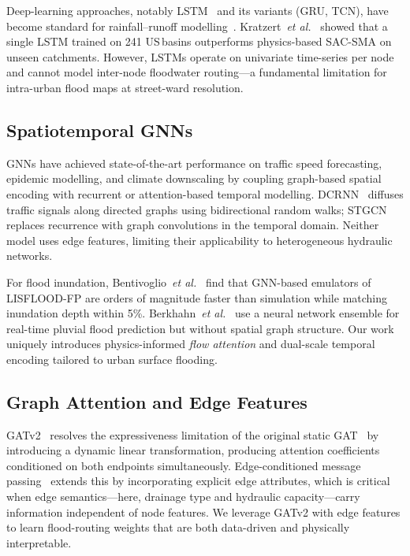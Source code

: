\documentclass[10pt,twocolumn]{article}
\begin{document}
Deep-learning approaches, notably LSTM~\cite{hochreiter1997} and its
variants (GRU, TCN), have become standard for rainfall--runoff
modelling~\cite{kratzert2018,hu2018}.
Kratzert~\emph{et al.}~\cite{kratzert2018} showed that a single LSTM
trained on 241 US\,basins outperforms physics-based SAC-SMA on unseen
catchments.
However, LSTMs operate on univariate time-series per node and cannot model
inter-node floodwater routing---a fundamental limitation for intra-urban
flood maps at street-ward resolution.

\subsection{Spatiotemporal GNNs}

GNNs have achieved state-of-the-art performance on traffic speed
forecasting, epidemic modelling, and climate downscaling by coupling
graph-based spatial encoding with recurrent or attention-based temporal
modelling.
DCRNN~\cite{li2018dcrnn} diffuses traffic signals along directed graphs
using bidirectional random walks; STGCN~\cite{yu2018stgcn} replaces
recurrence with graph convolutions in the temporal domain.
Neither model uses edge features, limiting their applicability to
heterogeneous hydraulic networks.

For flood inundation, Bentivoglio~\emph{et al.}~\cite{bentivoglio2023}
find that GNN-based emulators of LISFLOOD-FP are orders of magnitude faster
than simulation while matching inundation depth within 5\%.
Berkhahn~\emph{et al.}~\cite{berkhahn2019} use a neural network ensemble
for real-time pluvial flood prediction but without spatial graph structure.
Our work uniquely introduces physics-informed \emph{flow attention} and
dual-scale temporal encoding tailored to urban surface flooding.

\subsection{Graph Attention and Edge Features}

GATv2~\cite{brody2022} resolves the expressiveness limitation of the
original static GAT~\cite{velickovic2018gat} by introducing a dynamic
linear transformation, producing attention coefficients conditioned on both
endpoints simultaneously.
Edge-conditioned message passing~\cite{gilmer2017} extends this by
incorporating explicit edge attributes, which is critical when edge
semantics---here, drainage type and hydraulic capacity---carry information
independent of node features.
We leverage GATv2 with edge features to learn flood-routing weights that are
both data-driven and physically interpretable.
\end{document}
